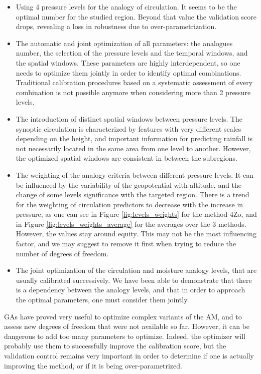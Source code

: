 \documentclass[5p]{elsarticle}
\begin{document}
\begin{itemize}
	\item Using 4 pressure levels for the analogy of circulation. It seems to be the optimal number for the studied region. Beyond that value the validation score drops, revealing a loss in robustness due to over-parametrization.
	\item The automatic and joint optimization of all parameters: the analogues number, the selection of the pressure levels and the temporal windows, and the spatial windows. These parameters are highly interdependent, so one needs to optimize them jointly in order to identify optimal combinations. Traditional calibration procedures based on a systematic assessment of every combination is not possible anymore when considering more than 2 pressure levels.
	\item The introduction of distinct spatial windows between pressure levels. The synoptic circulation is characterized by features with very different scales depending on the height, and important information for predicting rainfall is not necessarily located in the same area from one level to another. However, the optimized spatial windows are consistent in between the subregions.
	\item The weighting of the analogy criteria between different pressure levels. It can be influenced by the variability of the geopotential with altitude, and the change of some levels significance with the targeted region. There is a trend for the weighting of circulation predictors to decrease with the increase in pressure, as one can see in Figure \ref{fig:levels_weights} for the method 4Zo, and in Figure \ref{fig:levels_weights_average} for the averages over the 3 methods. However, the values stay around equity. This may not be the most influencing factor, and we may suggest to remove it first when trying to reduce the number of degrees of freedom.
	\item The joint optimization of the circulation and moisture analogy levels, that are usually calibrated successively. We have been able to demonstrate that there is a dependency between the analogy levels, and that in order to approach the optimal parameters, one must consider them jointly.
\end{itemize}


GAs have proved very useful to optimize complex variants of the AM, and to assess new degrees of freedom that were not available so far. However, it can be dangerous to add too many parameters to optimize. Indeed, the optimizer will probably use them to successfully improve the calibration score, but the validation control remains very important in order to determine if one is actually improving the method, or if it is being over-parametrized.
\end{document}

